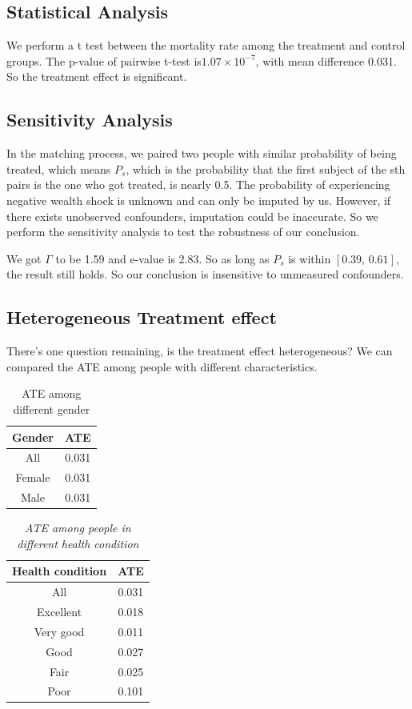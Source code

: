 \documentclass[aoas,preprint]{imsart}
\begin{document}
\subsection{Statistical Analysis}
We perform a t test between the mortality rate among the treatment and control groups. The p-value of pairwise t-test is$ 1.07\times 10^{-7}$, with mean difference 0.031. So the treatment effect is significant.

\subsection{Sensitivity Analysis}
In the matching process, we paired two people with similar probability of being treated, which means $P_s$, which is the probability that the first subject of the sth pairs is the one who got treated, is nearly 0.5. The probability of experiencing negative wealth shock is unknown and can only be imputed by us. However, if there exists unobserved confounders, imputation could be inaccurate. So we perform the sensitivity analysis to test the robustness of our conclusion.

We got $\Gamma$ to be 1.59 and e-value is 2.83. So as long as $P_s$ is within $[0.39, \,0.61]$, the result still holds. So our conclusion is insensitive to unmeasured confounders.

\subsection{Heterogeneous Treatment effect}
There's one question remaining, is the treatment effect heterogeneous? We can compared the ATE among people with different characteristics.

\begin{table}[!ht] %
\centering
\caption{ATE among different gender}
\begin{tabular}{|c|c|}
\hline
Gender & ATE \\
\hline
All & 0.031 \\
\hline
Female & 0.031 \\
\hline
Male & 0.031 \\
\hline
\end{tabular}
\end{table}



\begin{table}[!ht] %
\centering
\caption{\textsl{ATE among people in different health condition}}
\begin{tabular}{|c|c|}
\hline
Health condition & ATE \\
\hline
All & 0.031 \\
\hline
Excellent & 0.018 \\
\hline
Very good & 0.011 \\
\hline
Good & 0.027 \\
\hline
Fair & 0.025 \\
\hline
Poor & 0.101 \\
\hline
\end{tabular}
\end{table}
\end{document}
